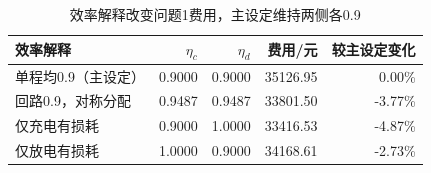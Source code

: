 \begin{table}[H]\centering\small
\caption{效率解释改变问题1费用，主设定维持两侧各0.9}\label{tab:review_efficiency}
\begin{tabular}{lrrrr}\toprule
效率解释 & $\eta_c$ & $\eta_d$ & 费用/元 & 较主设定变化\\\midrule
单程均0.9（主设定） & 0.9000 & 0.9000 & 35126.95 & 0.00\%\\
回路0.9，对称分配 & 0.9487 & 0.9487 & 33801.50 & -3.77\%\\
仅充电有损耗 & 0.9000 & 1.0000 & 33416.53 & -4.87\%\\
仅放电有损耗 & 1.0000 & 0.9000 & 34168.61 & -2.73\%\\
\bottomrule\end{tabular}\end{table}
